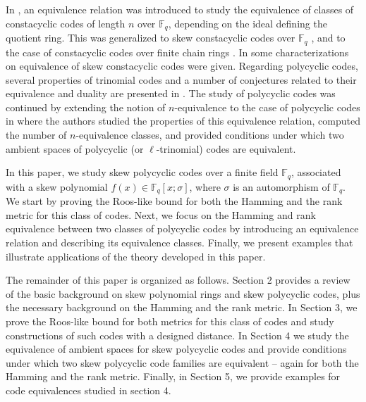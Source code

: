 \documentclass[12pt,paper]{article}
\theoremstyle{plain}
\newcommand{\Fq}{\mathbb{F}_{q}}
\begin{document}
In \cite{Chen2014}, an equivalence relation was introduced to study the equivalence of classes of constacyclic codes of length $n$ over $\mathbb{F}_q$, depending on the ideal defining the quotient ring. This was generalized to skew constacyclic codes over $\Fq$ \cite{Ouazzou2025}, and to the case of constacyclic codes over finite chain rings \cite{Chibloun2024}. In \cite{Boulanouar2021,Lobillo2025} some characterizations on equivalence of skew constacyclic codes were given. Regarding polycyclic codes,  several properties of trinomial codes and a number of conjectures related to their equivalence and duality are presented in \cite{Aydin2022, Shi2023}. The study of polycyclic codes was continued by extending the notion of $n$-equivalence to the case of polycyclic codes in \cite{Equiv2025} 
where the authors studied the properties of this equivalence relation, computed the number of $n$-equivalence classes, and provided conditions under which two ambient spaces of polycyclic (or $\ell$-trinomial) codes are equivalent. 

In this paper,  we study skew polycyclic codes over a finite field $\mathbb{F}_q$, associated with a skew polynomial $f(x) \in \mathbb{F}_q[x;\sigma]$, where $\sigma$ is an automorphism of $\mathbb{F}_q$. We start  by  proving  the Roos-like bound for both the Hamming and the rank metric for this class of codes. Next, we  focus on the Hamming and rank equivalence between two classes of polycyclic codes by introducing an equivalence relation and describing its equivalence classes. 
    Finally, we present examples that illustrate applications of the theory developed in this paper.


The remainder of this paper is organized as follows. Section 2 provides a review of the basic background on skew polynomial rings and skew polycyclic codes, plus the necessary background on the Hamming and the rank metric.  In Section 3, we prove the Roos-like bound for both metrics for this class of codes and study constructions of such codes with a designed distance. In Section 4 we study the equivalence of ambient spaces for skew polycyclic codes and provide conditions under which two skew polycyclic code families are equivalent -- again for both the Hamming and the rank metric. Finally, in Section 5, we provide examples for code equivalences studied in section 4.
\end{document}

